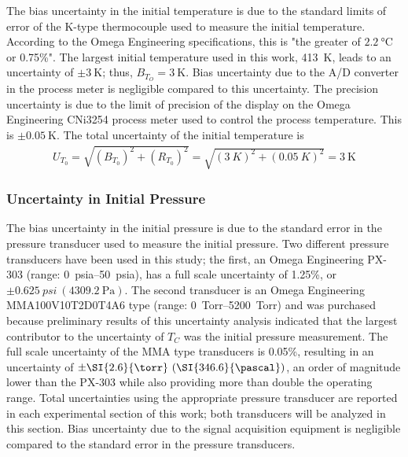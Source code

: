 \documentclass[../main.tex]{subfiles}
\begin{document}
The bias uncertainty in the initial temperature is due to the standard
limits of error of the K-type thermocouple used to measure the
initial temperature. According to the Omega Engineering
specifications, this is "the greater
of $\SI{2.2}{\degreeCelsius}$ or 0.75\%". The largest initial temperature
used in this work, \SI{413}{\kelvin}, leads to an uncertainty of
$\pm \SI{3}{\kelvin}$; thus, $B_{T_O}=\SI{3}{\kelvin}$. Bias uncertainty
due to the A/D converter in the process meter is negligible compared
to this uncertainty.
The precision uncertainty is due to the limit of precision of
the display on the Omega Engineering CNi3254 process meter used
to control the process temperature. This is $\pm\SI{0.05}{\kelvin}$.
The total uncertainty of the initial temperature is
%
\begin{align}
U_{T_0} = \sqrt{\left(B_{T_0}\right)^2 + \left(R_{T_0}\right)^2} = \sqrt{\left(\SI{3}{K}\right)^2 + \left(\SI{0.05}{K}\right)^2} = \SI{3}{\kelvin}
\end{align}

\subsubsection{Uncertainty in Initial Pressure}
\label{sec:unc-p0}

The bias uncertainty in the initial pressure is due to the
standard error in the pressure transducer used to measure
the initial pressure. Two different pressure transducers have
been used in this study; the first, an Omega Engineering PX-303
(range: \SIrange{0}{50}{psia}), has a full scale uncertainty of 1.25\%, or
$\pm \SI{0.625}{psi} \ (\SI{4309.2}{\pascal})$. The second transducer is an
Omega Engineering MMA100V10T2D0T4A6 type (range: \SIrange{0}{5200}{Torr}) and was
purchased because preliminary results of this uncertainty analysis
indicated that the largest contributor to the uncertainty of $T_C$ was
the initial pressure measurement. The full scale uncertainty of the MMA
type transducers is 0.05\%, resulting in an uncertainty of
$\pm \SI{2.6}{\torr} \ (\SI{346.6}{\pascal})$, an order of magnitude lower than
the PX-303 while also providing more than double the operating range. Total
uncertainties using the appropriate pressure transducer are reported in
each experimental section of this work; both transducers will be analyzed
in this section. Bias uncertainty due to the signal acquisition equipment
is negligible compared to the standard error in the pressure transducers.
\end{document}
